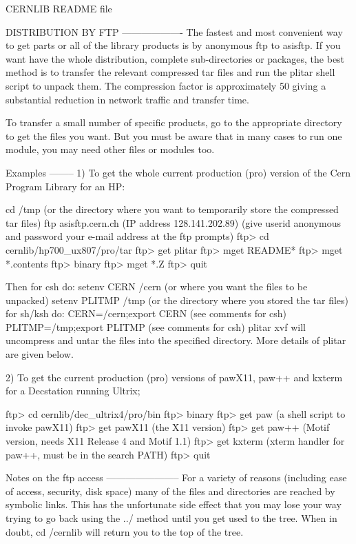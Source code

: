 \begin{XMPt}{CERNLIB README file}
 
DISTRIBUTION BY FTP
-------------------
The fastest and most convenient way to get parts or all of the library
products is by anonymous ftp to asisftp. If you want have the whole
distribution, complete sub-directories or packages, the best method is
to transfer the relevant compressed tar files and run the plitar shell
script to unpack them.  The compression factor is approximately 50%
giving a substantial reduction in network traffic and transfer time.
 
To transfer a small number of specific products, go to the appropriate
directory to get the files you want. But you must be aware that in many
cases to run one module, you may need other files or modules too.
 
Examples
--------
1) To get the whole current production (pro) version of the Cern Program
   Library for an HP:
 
cd /tmp              (or the directory where you want to temporarily store
                      the compressed tar files)
ftp asisftp.cern.ch       (IP address 128.141.202.89)
    (give userid anonymous and password your e-mail address at the ftp prompts)
ftp> cd cernlib/hp700_ux807/pro/tar
ftp> get plitar
ftp> mget README*
ftp> mget *.contents
ftp> binary
ftp> mget *.Z
ftp> quit
 
Then
for csh do:
     setenv CERN /cern  (or where you want the files to be unpacked)
     setenv PLITMP /tmp (or the directory where you stored the tar files)
for sh/ksh do:
     CERN=/cern;export CERN     (see comments for csh)
     PLITMP=/tmp;export PLITMP  (see comments for csh)
     plitar xvf
will uncompress and untar the files into the specified directory.
More details of plitar are given below.
 
 
2) To get the current production (pro) versions of pawX11, paw++ and kxterm
   for a Decstation running Ultrix;
 
ftp> cd cernlib/dec_ultrix4/pro/bin
ftp> binary
ftp> get paw           (a shell script to invoke pawX11)
ftp> get pawX11        (the X11 version)
ftp> get paw++         (Motif version, needs X11 Release 4  and Motif 1.1)
ftp> get kxterm        (xterm handler for paw++, must be in the search PATH)
ftp> quit
 
 
Notes on the ftp access
-----------------------
For a variety of reasons (including ease of access, security, disk
space) many of the files and directories are reached by symbolic links.
This has the unfortunate side effect that you may lose your way trying
to go back using the ../ method until you get used to the tree. When in
doubt,
  cd /cernlib
will return you to the top of the tree.
 

\end{XMPt}
